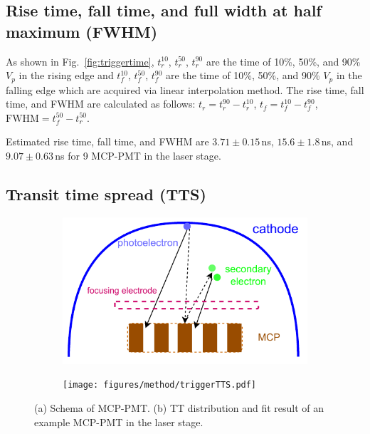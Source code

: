 \subsection{Rise time, fall time, and full width at half maximum (FWHM)}
As shown in Fig.~\ref{fig:triggertime}, $t^{10}_r$, $t^{50}_r$, $t^{90}_r$ are the time of 10\%, 50\%, and 90\% $V_p$ in the rising edge and $t^{10}_f$, $t^{50}_f$, $t^{90}_f$ are the time of 10\%, 50\%, and 90\% $V_p$ in the falling edge which are acquired via linear interpolation method. The rise time, fall time, and FWHM are calculated as follows: $t_r = t^{90}_r - t^{10}_r$, $t_f = t^{10}_f - t^{90}_f$, $\mathrm{FWHM} = t^{50}_f - t^{50}_r$.


 Estimated rise time, fall time, and FWHM are $3.71\pm0.15$\,ns, $15.6\pm1.8$\,ns, and $9.07\pm0.63$\,ns for 9 MCP-PMT in the laser stage.

\subsection{Transit time spread (TTS)}
\begin{figure}[!htbp]
    \centering
    \begin{subfigure}[b]{\SF\textwidth}
        \includegraphics[width=\textwidth]{figures/method/MCPelectron.pdf}
        \caption{}%
        \label{fig:mcpelectron}
    \end{subfigure}
    \begin{subfigure}[b]{\SF\textwidth}
        \texttt{[image: figures/method/triggerTTS.pdf]}
        \caption{}%
        \label{fig:triggerTTS}
    \end{subfigure}
    \caption{(a) Schema of MCP-PMT. (b) TT distribution and fit result of an example MCP-PMT in the laser stage.}
\end{figure}


